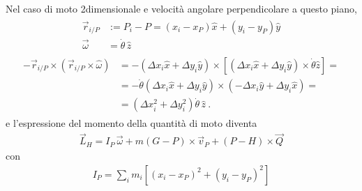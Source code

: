 \documentclass[letterpaper,10pt,italian]{jupyterBook}
\begin{document}
\sphinxAtStartPar
Nel caso di moto 2\sphinxhyphen{}dimensionale e velocità angolare perpendicolare a questo piano, 
\begin{equation*}
\begin{split}\begin{aligned}
  \vec{r}_{i/P} & := P_i - P = \left( x_i - x_P \right) \hat{x} + \left( y_i - y_P \right) \hat{y} \\
  \vec{\omega} & = \dot{\theta} \, \hat{z}
\end{aligned}\end{split}
\end{equation*}\begin{equation*}
\begin{split}\begin{aligned}
  - \vec{r}_{i/P} \times \left( \vec{r}_{i/P} \times \hat{\omega} \right) 
  & = - ( \Delta x_i \hat{x} + \Delta y_i \hat{y} ) \times \left[ ( \Delta x_i \hat{x} + \Delta y_i \hat{y} ) \times \dot{\theta} \hat{z} \right] = \\ 
  & = - \dot{\theta} ( \Delta x_i \hat{x} + \Delta y_i \hat{y} ) \times \left( - \Delta x_i \hat{y} + \Delta y_i \hat{x} \right) = \\
  & = \left( \Delta x_i^2 + \Delta y_i^2 \right) \dot{\theta} \, \hat{z} \ .
\end{aligned}\end{split}
\end{equation*}
\sphinxAtStartPar
e l’espressione del momento della quantità di moto diventa
\begin{equation*}
\begin{split}\vec{L}_{H} = I_P \, \vec{\omega} +  m (G - P) \times \vec{v}_P + \left( P - H \right) \times \vec{Q}\end{split}
\end{equation*}
\sphinxAtStartPar
con
\begin{equation*}
\begin{split}I_P = \sum_i m_i \left[ \left(x_i - x_P\right)^2 + \left(y_i - y_P\right)^2 \right]\end{split}
\end{equation*}
\sphinxstepscope
\end{document}
